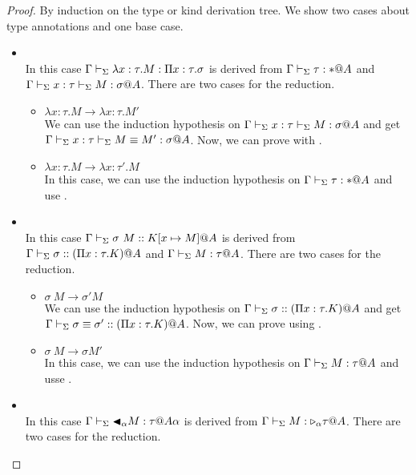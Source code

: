\begin{proof}
    By induction on the type or kind derivation tree. We show two cases about
    type annotations and one base case.
    \begin{itemize}
        \item \TAbs \\
            In this case \( \Gamma \vdash_\Sigma \lambda x:\tau.M : \Pi x:\tau.\sigma \) is
            derived from \( \Gamma \vdash_\Sigma \tau : * @A \) and \( \Gamma \vdash_\Sigma x:\tau \vdash_\Sigma M :
            \sigma @ A \). There are two cases for the reduction.
            \begin{itemize}
                \item \( \lambda x:\tau.M \longrightarrow \lambda x:\tau.M' \) \\
                    We can use the induction hypothesis on \( \Gamma \vdash_\Sigma x:\tau \vdash_\Sigma M
                    : \sigma @ A \) and get \( \Gamma \vdash_\Sigma x:\tau \vdash_\Sigma M \equiv M' : \sigma
                    @ A \). Now, we can prove with \QAbs.
                \item \( \lambda x:\tau.M \longrightarrow \lambda x:\tau'.M \) \\
                    In this case, we can use the induction hypothesis on \( \Gamma
                    \vdash_\Sigma \tau : * @A \) and use \QAbs.
            \end{itemize}
        \item \KApp \\
            In this case \( \Gamma \vdash_\Sigma \sigma\ M::K[x\mapsto M]@A \) is derived from \( \Gamma\vdash_\Sigma \sigma:: (\Pi x:\tau.K)@A \) and \( \G\V M:\tau@A \). There are two cases for the reduction.
            \begin{itemize}
                \item \( \sigma\ M \longrightarrow \sigma' M \) \\
                    We can use  the induction hypothesis on \( \Gamma\vdash_\Sigma \sigma ::
                    (\Pi x:\tau.K)@A \) and get \( \Gamma \vdash_\Sigma \sigma \equiv \sigma' ::
                    (\Pi x:\tau.K)@A \). Now, we can prove using \QTApp.
                \item \( \sigma\ M \longrightarrow \sigma M' \) \\
                    In this case, we can use the induction hypothesis on \(
                    \G\V M:\tau@A \) and usse \QTApp.
            \end{itemize}
        \item \TTBL \\
            In this case \( \G\V\TBL_{\alpha}M:\tau@{A\alpha} \) is derived from \( \G\V M:\TW_{\alpha}\tau@A \). There are two cases for the reduction.

\end{itemize}
\end{proof}
